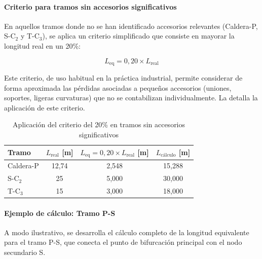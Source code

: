 \documentclass[12pt]{article}
\begin{document}
\paragraph{Criterio para tramos sin accesorios significativos}

En aquellos tramos donde no se han identificado accesorios relevantes (Caldera-P, S-C$_2$ y T-C$_3$), se aplica un criterio simplificado que consiste en mayorar la longitud real en un 20\%:

\begin{equation}
	L_{\text{eq}} = 0{,}20 \times L_{\text{real}}
	\label{eq:criterio-20-porciento}
\end{equation}

Este criterio, de uso habitual en la práctica industrial, permite considerar de forma aproximada las pérdidas asociadas a pequeños accesorios (uniones, soportes, ligeras curvaturas) que no se contabilizan individualmente. La  detalla la aplicación de este criterio.

\begin{table}[H]
	\centering
	\caption{Aplicación del criterio del 20\% en tramos sin accesorios significativos}
	\label{tab:tramos-criterio-20}
	\begin{tabular}{lccc}
		\toprule
		\textbf{Tramo} & \textbf{$L_{\text{real}}$ [m]} & \textbf{$L_{\text{eq}} = 0{,}20 \times L_{\text{real}}$ [m]} & \textbf{$L_{\text{cálculo}}$ [m]} \\
			\midrule
		Caldera-P      & 12,74                          & 2,548                                                        & 15,288                            \\
		S-C$_2$        & 25                             & 5,000                                                        & 30,000                            \\
		T-C$_3$        & 15                             & 3,000                                                        & 18,000                            \\
		\bottomrule
	\end{tabular}
\end{table}

\paragraph{Ejemplo de cálculo: Tramo P-S}

A modo ilustrativo, se desarrolla el cálculo completo de la longitud equivalente para el tramo P-S, que conecta el punto de bifurcación principal con el nodo secundario S.
\end{document}
